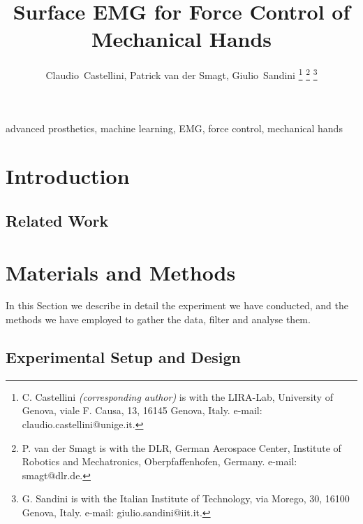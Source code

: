 \documentclass[journal]{IEEEtran}
\begin{document}

\title{Surface EMG for Force Control of\\Mechanical Hands}

\author{Claudio~Castellini, Patrick van der Smagt, Giulio~Sandini
\thanks{C. Castellini \emph{(corresponding author)}
  is with the LIRA-Lab, University of Genova,
  viale F. Causa, 13, 16145 Genova, Italy.
  e-mail: claudio.castellini@unige.it.}%
\thanks{P. van der Smagt is with the DLR, German Aerospace Center,
  Institute of Robotics and Mechatronics, Oberpfaffenhofen, Germany.
  e-mail: smagt@dlr.de.}%
\thanks{G. Sandini is with the Italian Institute of Technology,
  via Morego, 30, 16100 Genova, Italy.
  e-mail: giulio.sandini@iit.it.}%
}

\maketitle

\begin{abstract}
  
\end{abstract}

\begin{IEEEkeywords}
advanced prosthetics, machine learning, EMG, force control, mechanical hands
\end{IEEEkeywords}

\IEEEpeerreviewmaketitle


\section{Introduction}
\label{sec:introduction}


\subsection{Related Work}
\label{subsec:relatedwork}


\section{Materials and Methods}
\label{sec:m&ms}

In this Section we describe in detail the experiment we have
conducted, and the methods we have employed to gather the data, filter
and analyse them.

\subsection{Experimental Setup and Design}
\label{subsec:setup}

\end{document}
